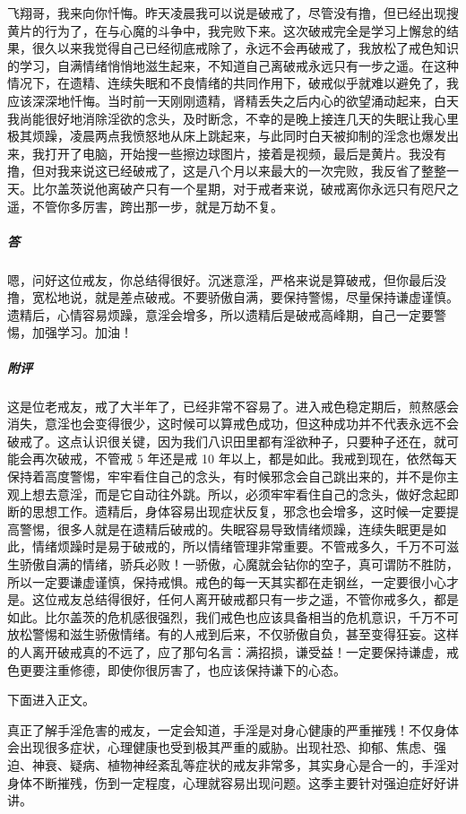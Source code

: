 \begin{case}
    飞翔哥，我来向你忏悔。昨天凌晨我可以说是破戒了，尽管没有撸，但已经出现搜黄片的行为了，在与心魔的斗争中，我完败下来。这次破戒完全是学习上懈怠的结果，很久以来我觉得自己已经彻底戒除了，永远不会再破戒了，我放松了戒色知识的学习，自满情绪悄悄地滋生起来，不知道自己离破戒永远只有一步之遥。在这种情况下，在遗精、连续失眠和不良情绪的共同作用下，破戒似乎就难以避免了，我应该深深地忏悔。当时前一天刚刚遗精，肾精丢失之后内心的欲望涌动起来，白天我尚能很好地消除淫欲的念头，及时断念，不幸的是晚上接连几天的失眠让我心里极其烦躁，凌晨两点我愤怒地从床上跳起来，与此同时白天被抑制的淫念也爆发出来，我打开了电脑，开始搜一些擦边球图片，接着是视频，最后是黄片。我没有撸，但对我来说这已经破戒了，这是八个月以来最大的一次完败，我反省了整整一天。比尔盖茨说他离破产只有一个星期，对于戒者来说，破戒离你永远只有咫尺之遥，不管你多厉害，跨出那一步，就是万劫不复。
    \subparagraph{答} 嗯，问好这位戒友，你总结得很好。沉迷意淫，严格来说是算破戒，但你最后没撸，宽松地说，就是差点破戒。不要骄傲自满，要保持警惕，尽量保持谦虚谨慎。遗精后，心情容易烦躁，意淫会增多，所以遗精后是破戒高峰期，自己一定要警惕，加强学习。加油！
    \subparagraph{附评} 这是位老戒友，戒了大半年了，已经非常不容易了。进入戒色稳定期后，煎熬感会消失，意淫也会变得很少，这时候可以算戒色成功，但这种成功并不代表永远不会破戒了。这点认识很关键，因为我们八识田里都有淫欲种子，只要种子还在，就可能会再次破戒，不管戒 5 年还是戒 10 年以上，都是如此。我戒到现在，依然每天保持着高度警惕，牢牢看住自己的念头，有时候邪念会自己跳出来的，并不是你主观上想去意淫，而是它自动往外跳。所以，必须牢牢看住自己的念头，做好念起即断的思想工作。遗精后，身体容易出现症状反复，邪念也会增多，这时候一定要提高警惕，很多人就是在遗精后破戒的。失眠容易导致情绪烦躁，连续失眠更是如此，情绪烦躁时是易于破戒的，所以情绪管理非常重要。不管戒多久，千万不可滋生骄傲自满的情绪，骄兵必败！一骄傲，心魔就会钻你的空子，真可谓防不胜防，所以一定要谦虚谨慎，保持戒惧。戒色的每一天其实都在走钢丝，一定要很小心才是。这位戒友总结得很好，任何人离开破戒都只有一步之遥，不管你戒多久，都是如此。比尔盖茨的危机感很强烈，我们戒色也应该具备相当的危机意识，千万不可放松警惕和滋生骄傲情绪。有的人戒到后来，不仅骄傲自负，甚至变得狂妄。这样的人离开破戒真的不远了，应了那句名言：满招损，谦受益！一定要保持谦虚，戒色更要注重修德，即使你很厉害了，也应该保持谦下的心态。
\end{case}

下面进入正文。

真正了解手淫危害的戒友，一定会知道，手淫是对身心健康的严重摧残！不仅身体会出现很多症状，心理健康也受到极其严重的威胁。出现社恐、抑郁、焦虑、强迫、神衰、疑病、植物神经紊乱等症状的戒友非常多，其实身心是合一的，手淫对身体不断摧残，伤到一定程度，心理就容易出现问题。这季主要针对强迫症好好讲讲。

